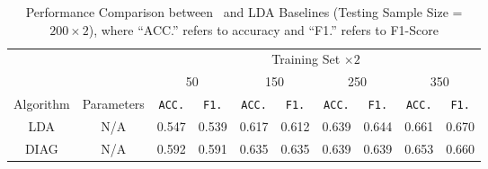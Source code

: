 \begin{table*}
{
\begin{center}
\caption{Performance Comparison between \TheName\ and LDA Baselines (Testing Sample Size =$200\times 2$), where ``ACC.'' refers to accuracy and ``F1.'' refers to F1-Score}
		\label{tab:table11}
\begin{tabular}{*{10}{c}}
\toprule
    & & \multicolumn{8}{c}{Training Set $\times 2$}\\
    \cmidrule(lr){3-10}
    & & 
    \multicolumn{2}{c}{50} &
    \multicolumn{2}{c}{150} &
    \multicolumn{2}{c}{250} &
    \multicolumn{2}{c}{350} \\
\cmidrule(lr){3-4}
\cmidrule(lr){5-6}
\cmidrule(lr){7-8}
\cmidrule(lr){9-10}
Algorithm & Parameters & \texttt{ACC.} & \texttt{F1.} & 
									   	 \texttt{ACC.} & \texttt{F1.} & 
                          			 \texttt{ACC.} & \texttt{F1.} & 
                           			 \texttt{ACC.} & \texttt{F1.} \\
 \cmidrule(lr){1-2}                        
\cmidrule(lr){3-4}
\cmidrule(lr){5-6}
\cmidrule(lr){7-8}
\cmidrule(lr){9-10}
    LDA & N/A &   0.547 & 0.539   &     0.617 & 0.612       & 0.639 & 0.644      & 0.661 & 0.670 \\
 
\cmidrule(lr){1-2}                        
\cmidrule(lr){3-4}
\cmidrule(lr){5-6}
\cmidrule(lr){7-8}
\cmidrule(lr){9-10}
    DIAG & N/A &   0.592 & 0.591 &      0.635 & 0.635 &      0.639 & 0.639&   0.653 & 0.660    \\
    \cmidrule(lr){1-2}                        
\cmidrule(lr){3-4}
\cmidrule(lr){5-6}
\cmidrule(lr){7-8}
\cmidrule(lr){9-10}


\end{tabular}
\end{center}}
\end{table*}
